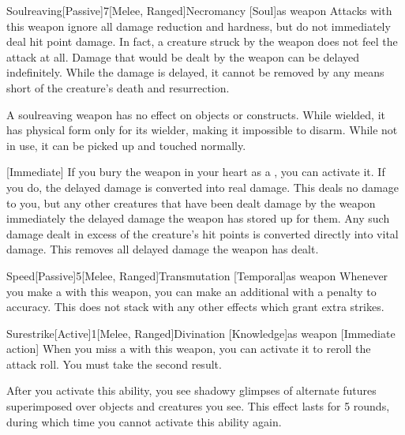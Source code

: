         \begin{magicitemdef}{Soulreaving}[Passive]{7}[Melee, Ranged]{Necromancy [Soul]}{as weapon}
             Attacks with this weapon ignore all damage reduction and hardness, but do not immediately deal hit point damage.
            In fact, a creature struck by the weapon does not feel the attack at all.
            Damage that would be dealt by the weapon can be delayed indefinitely.
            While the damage is delayed, it cannot be removed by any means short of the creature's death and resurrection.

            A soulreaving weapon has no effect on objects or constructs.
            While wielded, it has physical form only for its wielder, making it impossible to disarm.
            While not in use, it can be picked up and touched normally.

            [Immediate] If you bury the weapon in your heart as a , you can activate it.
            If you do, the delayed damage is converted into real damage.
            This deals no damage to you, but any other creatures that have been dealt damage by the weapon immediately the delayed damage the weapon has stored up for them.
            Any such damage dealt in excess of the creature's hit points is converted directly into vital damage.
            This removes all delayed damage the weapon has dealt.
        \end{magicitemdef}

        \begin{magicitemdef}{Speed}[Passive]{5}[Melee, Ranged]{Transmutation [Temporal]}{as weapon}
             Whenever you make a  with this weapon, you can make an additional  with a  penalty to accuracy.
            This does not stack with any other effects which grant extra strikes.
        \end{magicitemdef}

        \begin{magicitemdef}{Surestrike}[Active]{1}[Melee, Ranged]{Divination [Knowledge]}{as weapon}
            [Immediate action] When you miss a  with this weapon, you can activate it to reroll the attack roll.
            You must take the second result.

            After you activate this ability, you see shadowy glimpses of alternate futures superimposed over objects and creatures you see.
            This effect lasts for 5 rounds, during which time you cannot activate this ability again.
        \end{magicitemdef}

